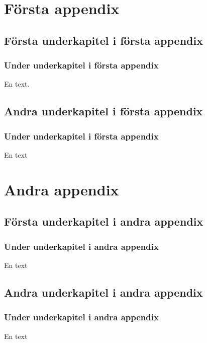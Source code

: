 \documentclass[10pt,oneside,swedish]{lips}
\begin{document}
\clearpage


\cleardoublepage
\appendix
\section{Första appendix}
\subsection{Första underkapitel i första appendix}
\lipsum[5]

\subsubsection{Under underkapitel i första appendix}
En text.

\subsection{Andra underkapitel i första appendix}
\lipsum[5]
\subsubsection{Under underkapitel i första appendix}
En text

\section{Andra appendix}
\subsection{Första underkapitel i andra appendix}
\lipsum[5]

\subsubsection{Under underkapitel i andra appendix}
En text

\subsection{Andra underkapitel i andra appendix}
\lipsum[5]
\subsubsection{Under underkapitel i andra appendix}
En text
\end{document}

